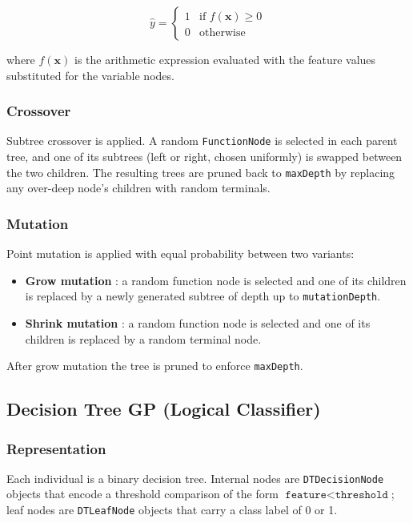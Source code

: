 \documentclass[12pt,a4paper]{article}
\begin{document}
\[
\hat{y} =
\begin{cases}
1 & \text{if } f(\mathbf{x}) \geq 0 \\
0 & \text{otherwise}
\end{cases}
\]

where $f(\mathbf{x})$ is the arithmetic expression evaluated with the feature values substituted for the variable nodes.

\subsubsection{Crossover}

Subtree crossover is applied. A random \texttt{FunctionNode} is selected in each parent tree, and one of its subtrees (left or right, chosen uniformly) is swapped between the two children. The resulting trees are pruned back to \texttt{maxDepth} by replacing any over-deep node's children with random terminals.

\subsubsection{Mutation}

Point mutation is applied with equal probability between two variants:
\begin{itemize}
    \item \textbf{Grow mutation} : a random function node is selected and one of its children is replaced by a newly generated subtree of depth up to \texttt{mutationDepth}.
    \item \textbf{Shrink mutation} : a random function node is selected and one of its children is replaced by a random terminal node.
\end{itemize}

After grow mutation the tree is pruned to enforce \texttt{maxDepth}.

\subsection{Decision Tree GP (Logical Classifier)}

\subsubsection{Representation}

Each individual is a binary decision tree. Internal nodes are \texttt{DTDecisionNode} objects that encode a threshold comparison of the form $\texttt{feature} < \texttt{threshold}$; leaf nodes are \texttt{DTLeafNode} objects that carry a class label of 0 or 1.
\end{document}
